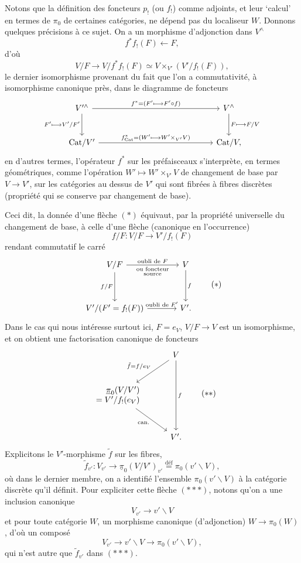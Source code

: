 \documentclass[11pt]{article}
\newcommand{\printedpage}[1]{\marginpar{\footnotesize p.~#1}}
\newcommand{\msp}[1]{\marginpar{\footnotesize [#1]}}
\newcommand{\Cat}{\mathrm{Cat}}
\newcommand{\defeq}{\overset{\text{déf}}{=}}
\newcommand{\upi}{\underline{\pi}}
\begin{document}
Notons que la définition des foncteurs $p_!$ (ou $f_!$) comme adjoints, et leur `calcul' en termes de $\pi_0$ de certaines catégories, ne dépend pas du localiseur $W$. Donnons quelques précisions à ce sujet. On a un morphisme d'adjonction dans $V^{\wedge}$
\[ f^*f_!(F) \longleftarrow F, \]
d'où
\[ V/F \longrightarrow V/f^*f_!(F) \simeq V \times_{V'} (V'/f_!(F)), \tag*{$(*)$} \]
le dernier isomorphisme provenant du fait que l'on a commutativité, à isomorphisme canonique près, dans le diagramme de foncteurs
\[
\begin{tikzcd}[column sep=14em, row sep=large]
V'^{\wedge} \arrow[r, "f^*=(F'\longmapsto F'\circ f)"] \arrow[d, "F'\longmapsto V'/F'"'] & V^{\wedge} \arrow[d, "F\longmapsto F/V"] \\
\Cat/V' \arrow[r, "f^*_{\Cat}=(W'\longmapsto W'\times_{V'}V)"] & \Cat/V,
\end{tikzcd}
\]
\printedpage{64}
\msp{page 90}
en d'autres termes, l'opérateur $f^*$ sur les préfaisceaux s'interprète, en termes géométriques, comme l'opération $W' \longmapsto W' \times_{V'} V$ de changement de base par $V \longrightarrow V'$, sur les catégories au dessus de $V'$ qui sont fibrées à fibres discrètes (propriété qui se conserve par changement de base).

Ceci dit, la donnée d'une flèche $(*)$ équivaut, par la propriété universelle du changement de base, à celle d'une flèche (canonique en l'occurrence)
\[ f/F : V/F \longrightarrow V'/f_!(F) \]
rendant commutatif le carré
\[
\begin{tikzcd}[column sep=large, row sep=huge]
V/F \arrow[r, "\text{oubli de }F", "\substack{\text{ou foncteur}\\ \text{source}}"'] \arrow[d, "f/F"'] & V \arrow[d, "f"] \\
V'/(F' = f_!(F)) \arrow[r, "\text{oubli de }F'"] & V'.
\end{tikzcd}
\tag*{$(*)$}
\]
Dans le cas qui nous intéresse surtout ici, $F = e_V$, $V/F \longrightarrow V$ est un isomorphisme, et on obtient une factorisation canonique de foncteurs \msp{page 91}
\[
\begin{tikzcd}[row sep=large]
 & V \arrow[dl, "\tilde{f}=f/e_V"'] \arrow[dd, "f"] \\
\begin{array}{r} \upi_0(V/V') \\ = V'/f_!(e_V) \end{array} \arrow[dr, "\text{can.}"'] & \\
 & V'.
\end{tikzcd}
\tag*{$(**)$}
\]
Explicitons le $V'$-morphisme $\tilde{f}$ sur les fibres,
\[ \tilde{f}_{v'} : V_{v'} \longrightarrow \upi_0(V/V')_{v'} \defeq \pi_0(v'\backslash V), \tag*{$(***)$} \]
où dans le dernier membre, on a identifié l'ensemble $\pi_0(v'\backslash V)$ à la catégorie discrète qu'il définit. Pour expliciter cette flèche $(***)$, notons qu'on a une inclusion canonique
\[ V_{v'} \longrightarrow v'\backslash V \]
et pour toute catégorie $W$, un morphisme canonique (d'adjonction) $W \longrightarrow \pi_0(W)$, d'où un composé
\[ V_{v'} \longrightarrow v'\backslash V \longrightarrow \pi_0(v'\backslash V), \]
qui n'est autre que $\tilde{f}_{v'}$ dans $(***)$.
\end{document}
